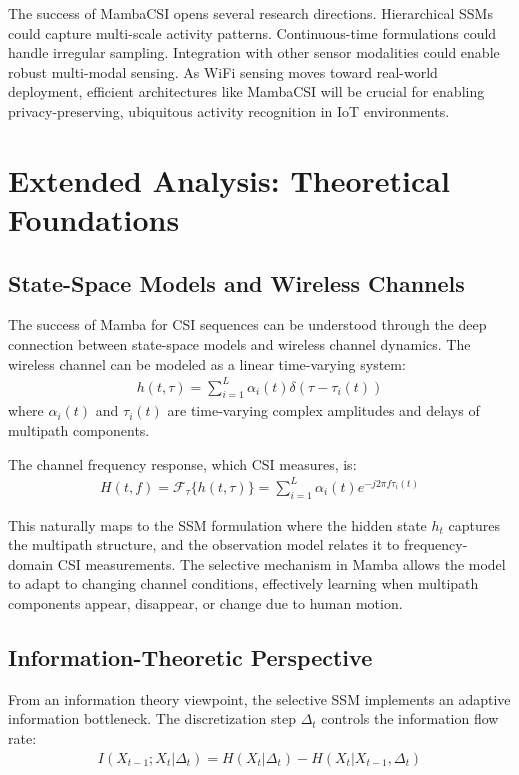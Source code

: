 \documentclass[journal]{IEEEtran}
\begin{document}
The success of MambaCSI opens several research directions. Hierarchical SSMs could capture multi-scale activity patterns. Continuous-time formulations could handle irregular sampling. Integration with other sensor modalities could enable robust multi-modal sensing. As WiFi sensing moves toward real-world deployment, efficient architectures like MambaCSI will be crucial for enabling privacy-preserving, ubiquitous activity recognition in IoT environments.

\section{Extended Analysis: Theoretical Foundations}

\subsection{State-Space Models and Wireless Channels}

The success of Mamba for CSI sequences can be understood through the deep connection between state-space models and wireless channel dynamics. The wireless channel can be modeled as a linear time-varying system:
\begin{align}
h(t, \tau) = \sum_{i=1}^{L} \alpha_i(t) \delta(\tau - \tau_i(t))
\end{align}
where $\alpha_i(t)$ and $\tau_i(t)$ are time-varying complex amplitudes and delays of multipath components.

The channel frequency response, which CSI measures, is:
\begin{align}
H(t, f) = \mathcal{F}_\tau\{h(t, \tau)\} = \sum_{i=1}^{L} \alpha_i(t) e^{-j2\pi f\tau_i(t)}
\end{align}

This naturally maps to the SSM formulation where the hidden state $h_t$ captures the multipath structure, and the observation model relates it to frequency-domain CSI measurements. The selective mechanism in Mamba allows the model to adapt to changing channel conditions, effectively learning when multipath components appear, disappear, or change due to human motion.

\subsection{Information-Theoretic Perspective}

From an information theory viewpoint, the selective SSM implements an adaptive information bottleneck. The discretization step $\Delta_t$ controls the information flow rate:
\begin{align}
I(X_{t-1}; X_t | \Delta_t) = H(X_t | \Delta_t) - H(X_t | X_{t-1}, \Delta_t)
\end{align}
\end{document}
